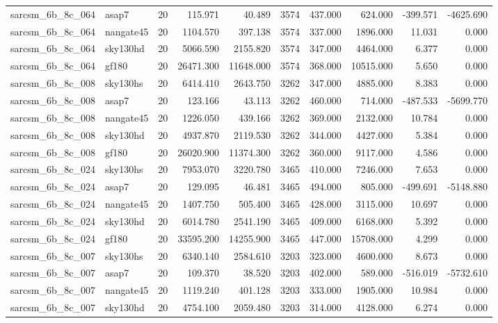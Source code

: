 \documentclass{article}
\begin{document}
\begin{longtable}{llrrrrrrrr}
sarcsm\_6b\_8c\_064 & asap7 & 20 & 115.971 & 40.489 & 3574 & 437.000 & 624.000 & -399.571 & -4625.690 \\
sarcsm\_6b\_8c\_064 & nangate45 & 20 & 1104.570 & 397.138 & 3574 & 337.000 & 1896.000 & 11.031 & 0.000 \\
sarcsm\_6b\_8c\_064 & sky130hd & 20 & 5066.590 & 2155.820 & 3574 & 347.000 & 4464.000 & 6.377 & 0.000 \\
sarcsm\_6b\_8c\_064 & gf180 & 20 & 26471.300 & 11648.000 & 3574 & 368.000 & 10515.000 & 5.650 & 0.000 \\
sarcsm\_6b\_8c\_008 & sky130hs & 20 & 6414.410 & 2643.750 & 3262 & 347.000 & 4885.000 & 8.383 & 0.000 \\
sarcsm\_6b\_8c\_008 & asap7 & 20 & 123.166 & 43.113 & 3262 & 460.000 & 714.000 & -487.533 & -5699.770 \\
sarcsm\_6b\_8c\_008 & nangate45 & 20 & 1226.050 & 439.166 & 3262 & 369.000 & 2132.000 & 10.784 & 0.000 \\
sarcsm\_6b\_8c\_008 & sky130hd & 20 & 4937.870 & 2119.530 & 3262 & 344.000 & 4427.000 & 5.384 & 0.000 \\
sarcsm\_6b\_8c\_008 & gf180 & 20 & 26020.900 & 11374.300 & 3262 & 360.000 & 9117.000 & 4.586 & 0.000 \\
sarcsm\_6b\_8c\_024 & sky130hs & 20 & 7953.070 & 3220.780 & 3465 & 410.000 & 7246.000 & 7.653 & 0.000 \\
sarcsm\_6b\_8c\_024 & asap7 & 20 & 129.095 & 46.481 & 3465 & 494.000 & 805.000 & -499.691 & -5148.880 \\
sarcsm\_6b\_8c\_024 & nangate45 & 20 & 1407.750 & 505.400 & 3465 & 428.000 & 3115.000 & 10.697 & 0.000 \\
sarcsm\_6b\_8c\_024 & sky130hd & 20 & 6014.780 & 2541.190 & 3465 & 409.000 & 6168.000 & 5.392 & 0.000 \\
sarcsm\_6b\_8c\_024 & gf180 & 20 & 33595.200 & 14255.900 & 3465 & 447.000 & 15708.000 & 4.299 & 0.000 \\
sarcsm\_6b\_8c\_007 & sky130hs & 20 & 6340.140 & 2584.610 & 3203 & 323.000 & 4600.000 & 8.673 & 0.000 \\
sarcsm\_6b\_8c\_007 & asap7 & 20 & 109.370 & 38.520 & 3203 & 402.000 & 589.000 & -516.019 & -5732.610 \\
sarcsm\_6b\_8c\_007 & nangate45 & 20 & 1119.240 & 401.128 & 3203 & 333.000 & 1905.000 & 10.984 & 0.000 \\
sarcsm\_6b\_8c\_007 & sky130hd & 20 & 4754.100 & 2059.480 & 3203 & 314.000 & 4128.000 & 6.274 & 0.000 \\

\end{longtable}
\end{document}

